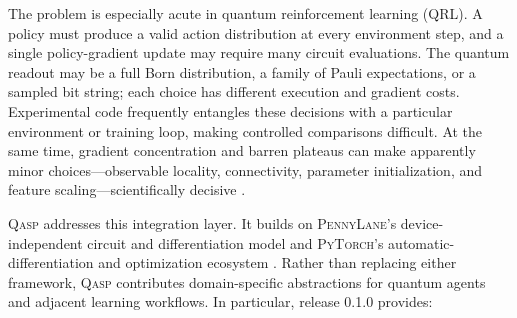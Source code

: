 \documentclass[10pt]{article}
\newcommand{\qasp}{\textsc{Qasp}}
\newcommand{\pennylane}{\textsc{PennyLane}}
\newcommand{\torch}{\textsc{PyTorch}}
\newcommand{\version}{0.1.0}
\begin{document}
The problem is especially acute in quantum reinforcement learning (QRL).  A policy must produce a valid action distribution at every environment step, and a single policy-gradient update may require many circuit evaluations.  The quantum readout may be a full Born distribution, a family of Pauli expectations, or a sampled bit string; each choice has different execution and gradient costs.  Experimental code frequently entangles these decisions with a particular environment or training loop, making controlled comparisons difficult.  At the same time, gradient concentration and barren plateaus can make apparently minor choices---observable locality, connectivity, parameter initialization, and feature scaling---scientifically decisive \cite{mcclean2018barren,larocca2022diagnosing}.

\qasp{} addresses this integration layer.  It builds on \pennylane{}'s device-independent circuit and differentiation model \cite{bergholm2018pennylane} and \torch{}'s automatic-differentiation and optimization ecosystem \cite{paszke2019pytorch}.  Rather than replacing either framework, \qasp{} contributes domain-specific abstractions for quantum agents and adjacent learning workflows.  In particular, release \version{} provides:
\end{document}
